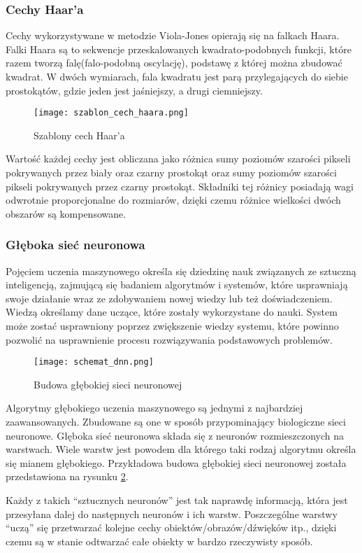 \subsubsection{Cechy Haar'a}
Cechy wykorzystywane w metodzie Viola-Jones opierają się na falkach Haara. Falki Haara są to sekwencje przeskalowanych kwadrato-podobnych funkcji, które razem tworzą falę(falo-podobną oscylację), podstawę z której można zbudować kwadrat. W dwóch wymiarach, fala kwadratu jest parą przylegających do siebie prostokątów, gdzie jeden jest jaśniejszy, a drugi ciemniejszy.
\begin{figure}[H]
	\centering
	\texttt{[image: szablon\_cech\_haara.png]}
	\caption{Szablony cech Haar'a}
	\label{fig:szablon_cech_haara}
\end{figure}
Wartość każdej cechy jest obliczana jako różnica sumy poziomów szarości pikseli pokrywanych przez biały oraz czarny prostokąt oraz sumy poziomów szarości pikseli pokrywanych przez czarny prostokąt. Składniki tej różnicy posiadają wagi odwrotnie proporcjonalne do rozmiarów, dzięki czemu różnice wielkości dwóch obszarów są kompensowane.

\subsubsection{Głęboka sieć neuronowa} \label{dnn}
Pojęciem uczenia maszynowego określa się dziedzinę nauk związanych ze sztuczną inteligencją, zajmującą się badaniem algorytmów i systemów, które usprawniają swoje działanie wraz ze zdobywaniem nowej wiedzy lub też doświadczeniem. Wiedzą określamy dane uczące, które zostały wykorzystane do nauki. System może zostać usprawniony poprzez zwiększenie wiedzy systemu, które powinno pozwolić na usprawnienie procesu rozwiązywania podstawowych problemów.
\begin{figure}[H]
	\centering
	\texttt{[image: schemat\_dnn.png]}
	\caption{Budowa głębokiej sieci neuronowej}
	\label{fig:budowa_dnn}
\end{figure}
Algorytmy głębokiego uczenia maszynowego są jednymi z najbardziej zaawansowanych. Zbudowane są one w sposób przypominający biologiczne sieci neuronowe. Głęboka sieć neuronowa składa się z neuronów rozmieszczonych na warstwach. Wiele warstw jest powodem dla którego taki rodzaj algorytmu określa się mianem głębokiego. Przykładowa budowa głębokiej sieci neuronowej została przedstawiona na rysunku \ref{fig:budowa_dnn}.

Każdy z takich “sztucznych neuronów” jest tak naprawdę informacją, która jest przesyłana dalej do następnych neuronów i ich warstw. Poszczególne warstwy “uczą” się przetwarzać kolejne cechy obiektów/obrazów/dźwięków itp., dzięki czemu są w stanie odtwarzać całe obiekty w bardzo rzeczywisty sposób.

